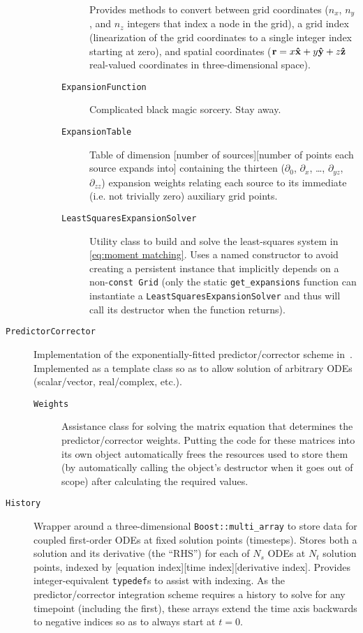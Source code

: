 \begin{description}
\begin{description}
\begin{description}
            Provides methods to convert between grid coordinates ($n_x$, $n_y$, and $n_z$ integers that index a node in the grid), a grid index (linearization of the grid coordinates to a single integer index starting at zero), and spatial coordinates ($\vb{r} = x \vu{x} + y \vu{y} + z \vu{z}$ real-valued coordinates in three-dimensional space).
          \item[\texttt{ExpansionFunction}] Complicated black magic sorcery. Stay away.
          \item[\texttt{ExpansionTable}] Table of dimension [number of sources][number of points each source expands into] containing the thirteen ($\partial_0$, $\partial_x$, \ldots, $\partial_{yz}$, $\partial_{zz}$) expansion weights relating each source to its immediate (i.e. not trivially zero) auxiliary grid points.
          \item[\texttt{LeastSquaresExpansionSolver}] Utility class to build and solve the least-squares system in \cref{eq:moment matching}.
            Uses a named constructor to avoid creating a persistent instance that implicitly depends on a non-\lstinline!const Grid! (only the static \lstinline!get_expansions! function can instantiate a \lstinline!LeastSquaresExpansionSolver! and thus will call its destructor when the function returns).
        \end{description}
    \end{description}
  \item[\texttt{PredictorCorrector}] Implementation of the exponentially-fitted predictor/corrector scheme in~\cite{Glaser2009}.
    Implemented as a template class so as to allow solution of arbitrary ODEs (scalar/vector, real/complex, etc.).
    \begin{description}
      \item[\texttt{Weights}] Assistance class for solving the matrix equation that determines the predictor/corrector weights.
        Putting the code for these matrices into its own object automatically frees the resources used to store them (by automatically calling the object's destructor when it goes out of scope) after calculating the required values.
    \end{description}
  \item[\texttt{History}] Wrapper around a three-dimensional \lstinline!Boost::multi_array! to store data for coupled first-order ODEs at fixed solution points (timesteps).
    Stores both a solution and its derivative (the ``RHS'') for each of $N_s$ ODEs at $N_t$ solution points, indexed by [equation index][time index][derivative index].
    Provides integer-equivalent \lstinline!typedef!s to assist with indexing.
    As the predictor/corrector integration scheme requires a history to solve for any timepoint (including the first), these arrays extend the time axis backwards to negative indices so as to always start at $t = 0$.
\end{description}
